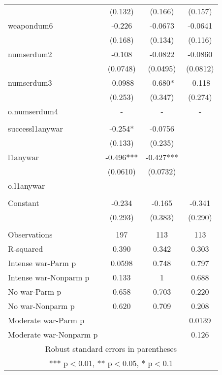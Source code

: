 \documentclass[]{article}
\begin{document}
\begin{tabular}{lccc}
 & (0.132) & (0.166) & (0.157) \\
weapondum6 & -0.226 & -0.0673 & -0.0641 \\
 & (0.168) & (0.134) & (0.116) \\
numserdum2 & -0.108 & -0.0822 & -0.0860 \\
 & (0.0748) & (0.0495) & (0.0812) \\
numserdum3 & -0.0988 & -0.680* & -0.118 \\
 & (0.253) & (0.347) & (0.274) \\
o.numserdum4 & - & - & - \\
 &  &  &  \\
successl1anywar & -0.254* & -0.0756 &  \\
 & (0.133) & (0.235) &  \\
l1anywar & -0.496*** & -0.427*** &  \\
 & (0.0610) & (0.0732) &  \\
o.l1anywar &  & - &  \\
 &  &  &  \\
Constant & -0.234 & -0.165 & -0.341 \\
 & (0.293) & (0.383) & (0.290) \\
 &  &  &  \\
Observations & 197 & 113 & 113 \\
R-squared & 0.390 & 0.342 & 0.303 \\
Intense war-Parm p & 0.0598 & 0.748 & 0.797 \\
Intense war-Nonparm p & 0.133 & 1 & 0.688 \\
No war-Parm p & 0.658 & 0.703 & 0.220 \\
No war-Nonparm p & 0.620 & 0.709 & 0.208 \\
Moderate war-Parm p &  &  & 0.0139 \\
 Moderate war-Nonparm p &  &  & 0.126 \\ \hline
\multicolumn{4}{c}{ Robust standard errors in parentheses} \\
\multicolumn{4}{c}{ *** p$<$0.01, ** p$<$0.05, * p$<$0.1} \\
\end{tabular}
\end{document}

